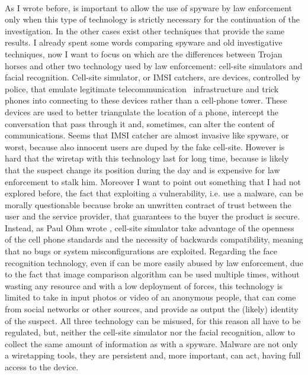 \paragraph{}
As I wrote before, is important to allow the use of spyware by law enforcement only when this type of technology is strictly necessary for the continuation of the investigation. In the other cases exist other techniques that provide the same results. I already spent some words comparing spyware and old investigative techniques, now I want to focus on which are the differences between Trojan horses and other two technology used by law enforcement: cell-site simulators and facial recognition. Cell-site simulator, or IMSI catchers, are devices, controlled by police, that emulate legitimate telecommunication  infrastructure and trick phones into connecting to these devices rather than a cell-phone tower. These devices are used to better triangulate the location of a phone, intercept the conversation that pass through it and, sometimes, can alter the content of communications. Seems that IMSI catcher are almost invasive like spyware, or worst, because also innocent users are duped by the fake cell-site. However is hard that the wiretap with this technology last for long time, because is likely that the suspect change its position during the day and is expensive for law enforcement to stalk him. Moreover I want to point out something that I had not explored before, the fact that exploiting a vulnerability, i.e. use a malware, can be morally questionable because broke an unwritten contract of trust between the user and the service provider, that guarantees to the buyer the product is secure. Instead, as Paul Ohm wrote \cite{cell_site_simulator}, cell-site simulator take advantage of the openness of the cell phone standards and the necessity of backwards compatibility, meaning that no bugs or system misconfigurations are exploited. Regarding the face recognition technology, even if can be more easily abused by law enforcement, due to the fact that image comparison algorithm can be used multiple times, without wasting any resource and with a low deployment of forces, this technology is limited to take in input photos or video of an anonymous people, that can come from social networks or other sources, and provide as output the (likely) identity of the suspect. All three technology can be misused, for this reason all have to be regulated, but, neither the cell-site simulator nor the facial recognition, allow to collect the same amount of information as with a spyware. Malware are not only a wiretapping tools, they are persistent and, more important, can act, having full access to the device.

